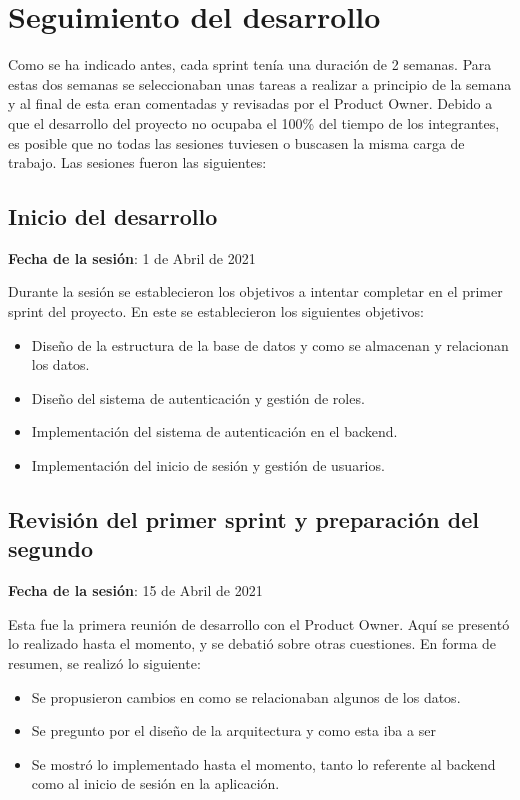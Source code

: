 \section{Seguimiento del desarrollo}

Como se ha indicado antes, cada sprint tenía una duración de 2 semanas. Para estas dos semanas se seleccionaban unas tareas a realizar a principio de la semana y al final de esta eran comentadas y revisadas por el Product Owner. Debido a que el desarrollo del proyecto no ocupaba el 100\% del tiempo de los integrantes, es posible que no todas las sesiones tuviesen o buscasen la misma carga de trabajo. Las sesiones fueron las siguientes:

\subsection{Inicio del desarrollo}

\textbf{Fecha de la sesión}: 1 de Abril de 2021

Durante la sesión se establecieron los objetivos a intentar completar en el primer sprint del proyecto. En este se establecieron los siguientes objetivos:

\begin{itemize}
    \item Diseño de la estructura de la base de datos y como se almacenan y relacionan los datos.
    \item Diseño del sistema de autenticación y gestión de roles.
    \item Implementación del sistema de autenticación en el backend.
    \item Implementación del inicio de sesión y gestión de usuarios.
\end{itemize}

\subsection{Revisión del primer sprint y preparación del segundo}

\textbf{Fecha de la sesión}: 15 de Abril de 2021

Esta fue la primera reunión de desarrollo con el Product Owner. Aquí se presentó lo realizado hasta el momento, y se debatió sobre otras cuestiones. En forma de resumen, se realizó lo siguiente:

\begin{itemize}
    \item Se propusieron cambios en como se relacionaban algunos de los datos.
    \item Se pregunto por el diseño de la arquitectura y como esta iba a ser
    \item Se mostró lo implementado hasta el momento, tanto lo referente al backend como al inicio de sesión en la aplicación. 
\end{itemize}

